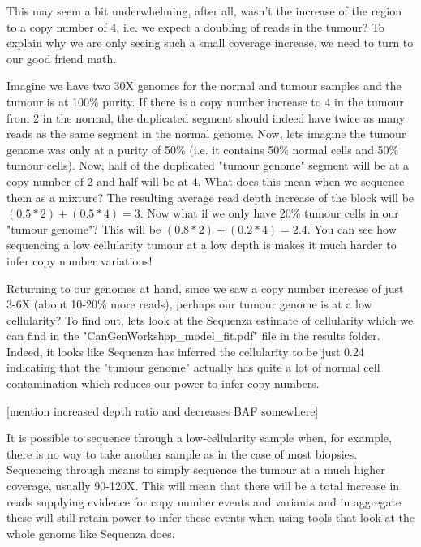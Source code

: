 This may seem a bit underwhelming, after all, wasn't the increase of the region to a copy number of 4, i.e. we expect a doubling of reads in the tumour? To explain why we are only seeing such a small coverage increase, we need to turn to our good friend math.

Imagine we have two 30X genomes for the normal and tumour samples and the tumour is at 100\% purity. If there is a copy number increase to 4 in the tumour from 2 in the normal, the duplicated segment should indeed have twice as many reads as the same segment in the normal genome. Now, lets imagine the tumour genome was only at a purity of 50\% (i.e. it contains 50\% normal cells and 50\% tumour cells). Now, half of the duplicated "tumour genome" segment will be at a copy number of 2 and half will be at 4. What does this mean when we sequence them as a mixture? The resulting average read depth increase of the block will be $(0.5*2)+(0.5*4) = 3$. Now what if we only have 20\% tumour cells in our "tumour genome"? This will be $(0.8*2)+(0.2*4) = 2.4$. You can see how sequencing a low cellularity tumour at a low depth is makes it much harder to infer copy number variations!

Returning to our genomes at hand, since we saw a copy number increase of just 3-6X (about 10-20\% more reads), perhaps our tumour genome is at a low cellularity? To find out, lets look at the Sequenza estimate of cellularity which we can find in the "CanGenWorkshop_model_fit.pdf" file in the results folder. Indeed, it looks like Sequenza has inferred the cellularity to be just 0.24 indicating that the "tumour genome" actually has quite a lot of normal cell contamination which reduces our power to infer copy numbers.

[mention increased depth ratio and decreases BAF somewhere]

\begin{note}
It is possible to sequence through a low-cellularity sample when, for example, there is no way to take another sample as in the case of most biopsies. Sequencing through means to simply sequence the tumour at a much higher coverage, usually 90-120X. This will mean that there will be a total increase in reads supplying evidence for copy number events and variants and in aggregate these will still retain power to infer these events when using tools that look at the whole genome like Sequenza does.
\end{note}


